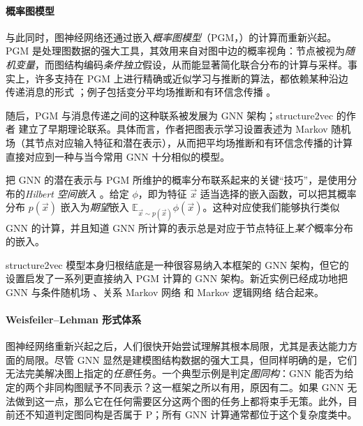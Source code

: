 \paragraph{概率图模型}
与此同时，图神经网络还通过嵌入\emph{概率图模型}（PGM，\cite{wainwright2008graphical}）的计算而重新兴起。
%
PGM 是处理图数据的强大工具，其效用来自对图中边的概率视角：节点被视为\emph{随机变量}，而图结构编码\emph{条件独立}假设，从而能显著简化联合分布的计算与采样。事实上，许多支持在 PGM 上进行精确或近似学习与推断的算法，都依赖某种沿边传递消息的形式 \citep{pearl2014probabilistic}；例子包括变分平均场推断和有环信念传播 \citep{yedidia2001bethe,murphy2013loopy}。

随后，PGM 与消息传递之间的这种联系被发展为 GNN 架构；structure2vec 的作者 \citep{dai2016discriminative} 建立了早期理论联系。具体而言，作者把图表示学习设置表述为 Markov 随机场（其节点对应输入特征和潜在表示），从而把平均场推断和有环信念传播的计算直接对应到一种与当今常用 GNN 十分相似的模型。

把 GNN 的潜在表示与 PGM 所维护的概率分布联系起来的关键“技巧”，是使用分布的\emph{Hilbert 空间嵌入} \citep{smola2007hilbert}。给定 $\phi$，即为特征 $\vec{x}$ 适当选择的嵌入函数，可以把其概率分布 $p(\vec{x})$ 嵌入为\emph{期望}嵌入 $\mathbb{E}_{\vec{x}\sim p(\vec{x})}\phi(\vec{x})$。这种对应使我们能够执行类似 GNN 的计算，并且知道 GNN 所计算的表示总是对应于节点特征上\emph{某个}概率分布的嵌入。

structure2vec 模型本身归根结底是一种很容易纳入本框架的 GNN 架构，但它的设置启发了一系列更直接纳入 PGM 计算的 GNN 架构。新近实例已经成功地把 GNN 与条件随机场 \citep{gao2019conditional,spalevic2020hierachial}、关系 Markov 网络 \citep{qu2019gmnn} 和 Markov 逻辑网络 \citep{zhang2020efficient} 结合起来。

\paragraph{Weisfeiler--Lehman 形式体系} 图神经网络重新兴起之后，人们很快开始尝试理解其根本局限，尤其是表达能力方面的局限。尽管 GNN 显然是建模图结构数据的强大工具，但同样明确的是，它们无法完美解决图上指定的\emph{任意}任务。一个典型示例是判定\emph{图同构}：GNN 能否为给定的两个非同构图赋予不同表示？这一框架之所以有用，原因有二。如果 GNN 无法做到这一点，那么它在任何需要区分这两个图的任务上都将束手无策。此外，目前还不知道判定图同构是否属于 \textsc{P}；所有 GNN 计算通常都位于这个复杂度类中。

